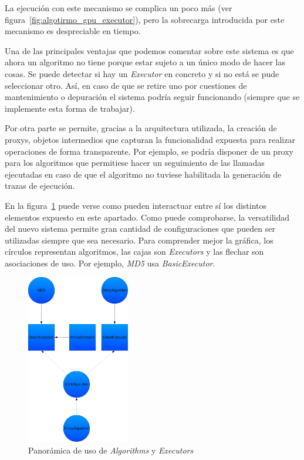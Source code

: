 La ejecución con este mecanismo se complica un poco más (ver figura~\ref{fig:algotirmo_gpu_executor}), pero la sobrecarga introducida por este mecanismo es despreciable en tiempo.

Una de las principales ventajas que podemos comentar sobre este sistema es que ahora un algoritmo no tiene porque estar sujeto a un único modo de hacer las cosas. Se puede detectar si hay un \emph{Executor} en concreto y si no está se pude seleccionar otro. Así, en caso de que se retire uno por cuestiones de mantenimiento o depuración el sistema podría seguir funcionando (siempre que se implemente esta forma de trabajar).

Por otra parte se permite, gracias a la arquitectura utilizada, la creación de proxys, objetos intermedios que capturan la funcionalidad expuesta para realizar operaciones de forma transparente. Por ejemplo, se podría disponer de un proxy para los algoritmos que permitiese hacer un seguimiento de las llamadas ejecutadas en caso de que el algoritmo no tuviese habilitada la generación de trazas de ejecución.

En la figura~\ref{fig:alg_ex_prox} puede verse como pueden interactuar entre sí los distintos elementos expuesto en este apartado. Como puede comprobarse, la versatilidad del nuevo sistema permite gran cantidad de configuraciones que pueden ser utilizadas siempre que sea necesario. Para comprender mejor la gráfica, los círculos representan algoritmos, las cajas son \emph{Executors} y las flechar son asociaciones de uso. Por ejemplo, \emph{MD5} usa \emph{BasicExecutor}.

\begin{figure}
	\centering
	\includegraphics[width=0.4\textwidth]{images/algorithms_executors_proxys.pdf}
	\caption{Panorámica de uso de \emph{Algorithms} y \emph{Executors}}\label{fig:alg_ex_prox}
\end{figure}

